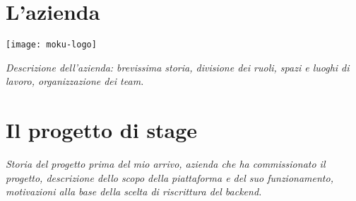
\section{L'azienda}

\begin{center}
	\texttt{[image: moku-logo]}
\end{center}
\emph{Descrizione dell'azienda: brevissima storia, divisione dei ruoli, spazi e luoghi di lavoro, organizzazione dei team.}

\section{Il progetto di stage}
\emph{Storia del progetto prima del mio arrivo, azienda che ha commissionato il progetto, descrizione dello scopo della piattaforma e del suo funzionamento, motivazioni alla base della scelta di riscrittura del backend.}

